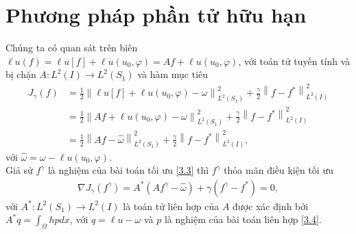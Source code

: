\documentclass[]{article}
\begin{document}
\section{Phương pháp phần tử hữu hạn}
\qquad Chúng ta có quan sát trên biên $\ell u(f)=\ell u[f]+\ell u(u_0, \varphi)=Af+\ell u(u_0, \varphi)$, với toán tử tuyến tính và bị chặn $A: L^2(I)\to L^2(S_1)$ và hàm mục tiêu
\begin{align*}
	J_\gamma(f)&=\frac{1}{2}\left\|\ell u[f]+\ell u(u_0, \varphi)-\omega\right\|^2_{L^2(S_1)}+\frac{\gamma}{2}\left\|f-f^*\right\|^2_{L^2(I)}\\
	&=\frac{1}{2}\left\|Af+\ell u(u_0, \varphi)-\omega\right\|^2_{L^2(S_1)}+\frac{\gamma}{2}\left\|f-f^*\right\|^2_{L^2(I)}\\
	&=\frac{1}{2}\left\|Af-\hat{\omega}\right\|^2_{L^2(S_1)}+\frac{\gamma}{2}\left\|f-f^*\right\|^2_{L^2(I)},
\end{align*}
với $\hat{\omega}=\omega-\ell u(u_0, \varphi)$.
\\
Giả sử $f^\gamma$ là nghiệm của bài toán tối ưu \eqref{3.3} thì $f^\gamma$ thỏa mãn điều kiện tối ưu
\begin{align}\label{3.8}
	\nabla J_\gamma(f^\gamma)= A^*(Af^\gamma-\hat{\omega})+\gamma(f^\gamma-f^*)=0,
\end{align}
với $A^*: L^2(S_1)\to L^2(I)$ là toán tử liên hợp của $A$ được xác định bởi $A^*q=\int_\Omega hpdx$, với $q=\ell u-\omega$ và $p$ là nghiệm của bài toán liên hợp \eqref{3.4}.
\end{document}
